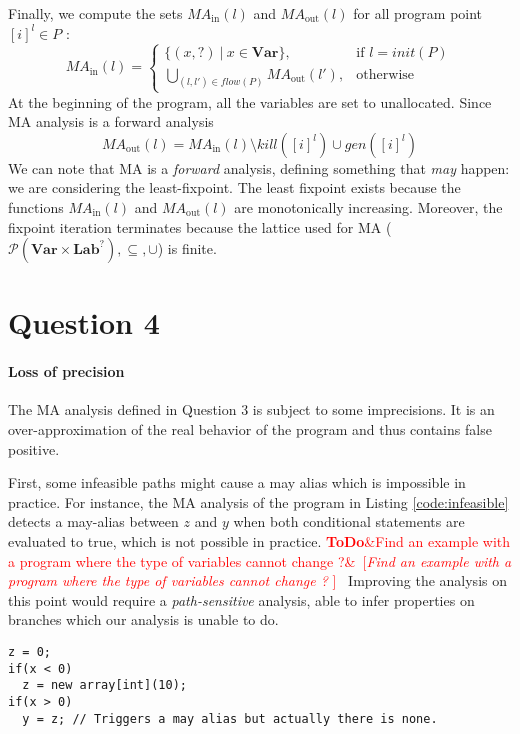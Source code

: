 \documentclass{article}
\newcommand{\todo}[1]{\textcolor{red}{\textbf{ToDo}\ifx&#1&\else ~[\emph{#1} ]~\fi}}
\begin{document}
Finally, we compute the sets \(M\!A_\text{in}(l)\) and \(M\!A_\text{out}(l)\) for all program point \([i]^l \in P\) :
 \[
    M\!A_\text{in}(l) =
    \begin{cases}
      \{(x,?)\ |\ x \in \textbf{Var}\},                        & \text{if } l=init(P)\\
      \bigcup\limits_{(l,l') \in flow(P)} M\!A_\text{out}(l'), & \text{otherwise}
    \end{cases}
\]
At the beginning of the program, all the variables are set to unallocated. Since MA analysis is a forward analysis
\[
    M\!A_\text{out}(l) = M\!A_\text{in}(l) \setminus kill([i]^l) \cup gen([i]^l)
\]
We can note that MA is a {\em forward} analysis, defining something that {\em may} happen: we are considering the least-fixpoint.
The least fixpoint exists because the functions \(M\!A_\text{in}(l)\) and \(M\!A_\text{out}(l)\) are monotonically increasing.
Moreover, the fixpoint iteration terminates because the lattice used for MA (\(\mathcal{P}(\textbf{Var} \times \textbf{Lab}^?), \subseteq, \cup\)) is finite.

\section*{Question 4}
\paragraph{Loss of precision}
The MA analysis defined in Question 3 is subject to some imprecisions. It is an over-approximation of the real behavior of the program and thus contains false positive.

First, some infeasible paths might cause a may alias which is impossible in practice.
For instance, the MA analysis of the program in Listing \ref{code:infeasible} detects a may-alias between \(z\) and \(y\) when both conditional statements are evaluated to true, which is not possible in practice.
\todo{Find an example with a program where the type of variables cannot change ?}
Improving the analysis on this point would require a {\em path-sensitive} analysis, able to infer properties on branches which our analysis is unable to do. 
\begin{lstlisting}[caption=Example of infeasible execution path causing a may aliasis., label=code:infeasible]
z = 0;
if(x < 0)
  z = new array[int](10);
if(x > 0)
  y = z; // Triggers a may alias but actually there is none.
\end{lstlisting}
\end{document}
